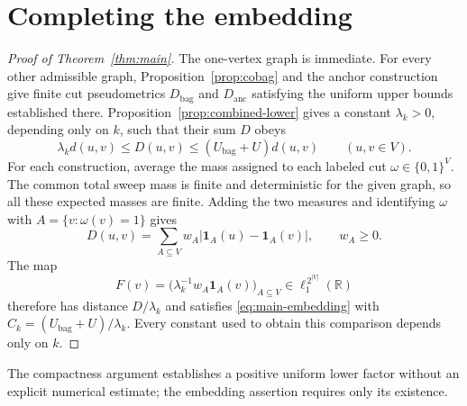 \section{Completing the embedding}\label{sec:conclusion}

\begin{proof}[Proof of Theorem~\ref{thm:main}]
The one-vertex graph is immediate. For every other admissible graph,
Proposition~\ref{prop:cobag} and the anchor construction give finite cut
pseudometrics $D_{\mathrm{bag}}$ and $D_{\mathrm{anc}}$ satisfying the uniform upper
bounds established there. Proposition~\ref{prop:combined-lower} gives a
constant $\lambda_k>0$, depending only on $k$, such that their sum $D$ obeys
\[
 \lambda_k d(u,v)\le D(u,v)\le (U_{\mathrm{bag}}+U)d(u,v)
 \qquad(u,v\in V).
\]
For each construction, average the mass assigned to each labeled cut
$\omega\in\{0,1\}^V$.  The common total sweep mass is finite and
deterministic for the given graph, so all these expected masses are
finite.  Adding the two measures and identifying $\omega$ with
$A=\{v:\omega(v)=1\}$ gives
\[
 D(u,v)=\sum_{A\subseteq V}w_A
   |\mathbf{1}_A(u)-\mathbf{1}_A(v)|,
 \qquad w_A\ge0.
\]
The map
\[
 F(v)=\bigl(\lambda_k^{-1}w_A\mathbf{1}_A(v)\bigr)_{A\subseteq V}
       \in\ell_1^{\,2^{|V|}}(\mathbb R)
\]
therefore has distance $D/\lambda_k$ and satisfies
\eqref{eq:main-embedding} with
$C_k=(U_{\mathrm{bag}}+U)/\lambda_k$.
Every constant used to obtain this comparison depends only on $k$.
\end{proof}

The compactness argument establishes a positive uniform lower factor without
an explicit numerical estimate; the embedding assertion requires only its
existence.
